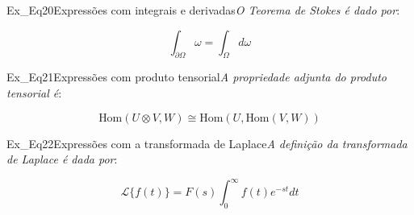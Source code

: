 \begin{texercise}{Ex_Eq20}{Expressões com integrais e derivadas}\textit{O Teorema de Stokes é dado por}:\par\smallskip%
\begin{tcboutputlisting}
    \begin{center}
        \begin{equation*}
            \int_{\partial{\Omega}} \omega = \int_{\Omega} d\omega
        \end{equation*}
    \end{center}
\end{tcboutputlisting}
\tcbuselistingtext%
\end{texercise}

\begin{texercise}{Ex_Eq21}{Expressões com produto tensorial}\textit{A propriedade adjunta do produto tensorial é}:\par\smallskip%
\begin{tcboutputlisting}
    \begin{center}
        \begin{equation*}
            \text{Hom}(U \otimes V, W) \cong 
            \text{Hom}(U, \text{Hom}(V,W))
        \end{equation*}
    \end{center}
\end{tcboutputlisting}
\tcbuselistingtext%
\end{texercise}
  
\begin{texercise}{Ex_Eq22}{Expressões com a transformada de Laplace}\textit{A definição da transformada de Laplace é dada por}:\par\smallskip%
\begin{tcboutputlisting}
    \begin{center}
        \begin{equation*}
            \mathcal{L} \lbrace f(t) \rbrace = 
            F(s) \int_{0}^{\infty} f(t) e^{-st} dt
        \end{equation*}
    \end{center}
\end{tcboutputlisting}
\tcbuselistingtext%
\end{texercise}
  
